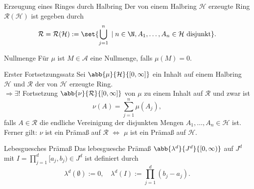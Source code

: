\begin{karte}{Erzeugung eines Ringes durch Halbring}
	Der von einem Halbring \( \mathcal{H} \) erzeugte Ring \( \mathcal{R}(\mathcal{H}) \) ist gegeben durch 
	\[ \mathcal{R} = \mathcal{R}(\mathcal{H}) := \set{ \bigcup_{j=1}^n \;|\; n\in\N, A_1, \ldots, A_n \in \mathcal{H} \text{ disjunkt} }. \]
\end{karte}

\begin{karte}{Nullmenge}
	Für \(\mu\) ist \( M\in \mathcal{A} \) eine Nullmenge, falls \( \mu(M) = 0 \).
\end{karte}

\begin{karte}{Erster Fortsetzungssatz}
	Sei \( \abb{\mu}{\mathcal{H}}{[0,\infty]} \) ein Inhalt auf einem Halbring \(\mathcal{H}\) 
	und \( \mathcal{R} \) der von \(\mathcal{H}\) erzeugte Ring.\\
	\(\Rightarrow \exists !\) Fortsetzung \( \abb{\nu}{\mathcal{R}}{[0,\infty]} \) von \(\mu\) 
	zu einem Inhalt auf \(\mathcal{R}\) und zwar ist 
	\[ \nu(A) = \sum_{j=1}^n \mu(A_j), \]
	falls \(A \in \mathcal{R}\) die endliche Vereinigung der disjunkten Mengen \(A_1,\ldots,A_n\in\mathcal{H}\) ist.\\
	Ferner gilt: \(\nu\) ist ein Prämaß auf \(\mathcal{R}\) 
	\(\Leftrightarrow\) \(\mu\) ist ein Prämaß auf \(\mathcal{H}\).
\end{karte}

\begin{karte}{Lebesguesches Prämaß}
	Das lebesguesche Prämaß \( \abb{\lambda^d}{J^d}{[0,\infty)} \) auf \(J^d\) 
	mit \(I = \prod_{j=1}^d [a_j,b_j) \in J^d \) ist definiert durch 
	\[ \lambda^d(\emptyset) := 0, \quad \lambda^d(I) := \prod_{j=1}^d (b_j - a_j). \] 
\end{karte}